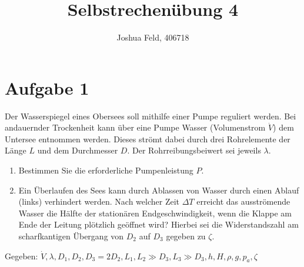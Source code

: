 \documentclass{exercise}
\institute{Lehrstuhl für Strömungslehre und Aerodynamisches Institut}
\title{Selbstrechenübung 4}
\author{Joshua Feld, 406718}
\begin{document}
    \maketitle


    \section*{Aufgabe 1}
    
    \begin{problem}
        Der Wasserspiegel eines Obersees soll mithilfe einer Pumpe reguliert werden.
        Bei andauernder Trockenheit kann über eine Pumpe Wasser (Volumenstrom \(\dot{V}\)) dem Untersee entnommen werden.
        Dieses strömt dabei durch drei Rohrelemente der Länge \(L\) und dem Durchmesser \(D\).
        Der Rohrreibungsbeiwert sei jeweils \(\lambda\).
        \begin{enumerate}
            \item Bestimmen Sie die erforderliche Pumpenleistung \(P\).
            \item Ein Überlaufen des Sees kann durch Ablassen von Wasser durch einen Ablauf (links) verhindert werden.
            Nach welcher Zeit \(\Delta T\) erreicht das ausströmende Wasser die Hälfte der stationären Endgeschwindigkeit, wenn die Klappe am Ende der Leitung plötzlich geöffnet wird?
            Hierbei sei die Widerstandszahl am scharfkantigen Übergang von \(D_2\) auf \(D_3\) gegeben zu \(\zeta\).
        \end{enumerate}
        Gegeben: \(\dot{V}, \lambda, D_1, D_2, D_3 = 2D_2, L_1, L_2 \gg D_3, L_3 \gg D_3, h, H, \rho, g, p_a, \zeta\)
    \end{problem}
    
\end{document}
